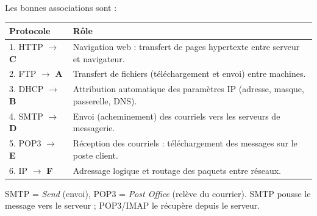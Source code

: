 \documentclass[11pt]{article}
\begin{document}
\begin{corrige}

Les bonnes associations sont :

\begin{center}
\begin{tabularx}{\linewidth}{|l|X|}
\hline
\rowcolor{popblueL}
\textbf{Protocole} & \textbf{Rôle} \\
\hline
1. HTTP $\rightarrow$ \textbf{C} & Navigation web : transfert de pages hypertexte entre serveur et navigateur. \\
\hline
2. FTP $\rightarrow$ \textbf{A} & Transfert de fichiers (téléchargement et envoi) entre machines. \\
\hline
3. DHCP $\rightarrow$ \textbf{B} & Attribution automatique des paramètres IP (adresse, masque, passerelle, DNS). \\
\hline
4. SMTP $\rightarrow$ \textbf{D} & Envoi (acheminement) des courriels vers les serveurs de messagerie. \\
\hline
5. POP3 $\rightarrow$ \textbf{E} & Réception des courriels : téléchargement des messages sur le poste client. \\
\hline
6. IP $\rightarrow$ \textbf{F} & Adressage logique et routage des paquets entre réseaux. \\
\hline
\end{tabularx}
\end{center}

\begin{aretenir}
SMTP = \emph{Send} (envoi), POP3 = \emph{Post Office} (relève du courrier). SMTP pousse le message vers le serveur ; POP3/IMAP le récupère depuis le serveur.
\end{aretenir}
\end{corrige}
\end{document}
